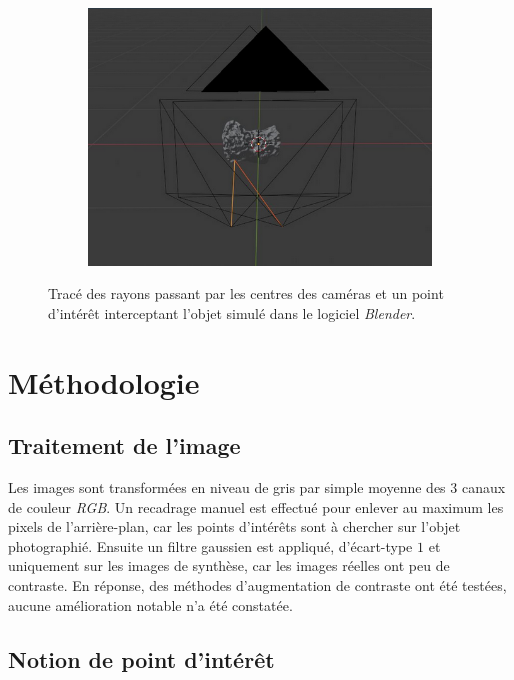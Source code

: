 \documentclass[
	a4paper, %
	10pt, %
	unnumberedsections, %
	twoside, %
]{LTJournalArticle}
\begin{document}
\begin{figure}[H]
	\centering
	\begin{subfigure}[H]{\columnwidth}
		\centering
		\includegraphics[width=\textwidth]{images/blender_check.png}
	\end{subfigure}
	\caption{Tracé des rayons passant par les centres des caméras et un point d'intérêt interceptant l'objet simulé dans le logiciel \textit{Blender}.}
	\label{figure:blender_check}
\end{figure}

\section{Méthodologie}

\subsection{Traitement de l'image}
Les images sont transformées en niveau de gris par simple moyenne des $3$ canaux de couleur \textit{RGB}.
Un recadrage manuel est effectué pour enlever au maximum les pixels de l'arrière-plan, car les points
d'intérêts sont à chercher sur l'objet photographié. Ensuite un filtre gaussien est
appliqué, d'écart-type $1$ et uniquement sur les images de synthèse, car les images réelles
ont peu de contraste. En réponse, des méthodes d'augmentation
de contraste ont été testées, aucune amélioration notable n'a été constatée.


\subsection{Notion de point d'intérêt}
\end{document}
